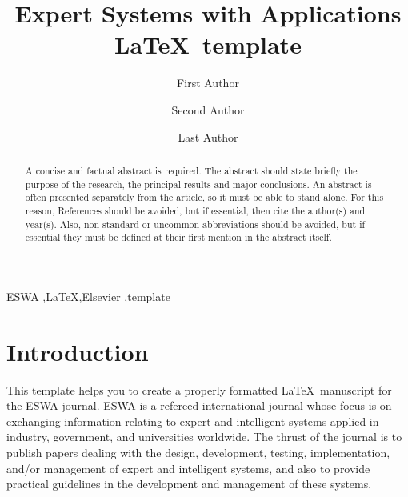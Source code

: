 \documentclass[review]{elsarticle}
\begin{document}
\begin{frontmatter}
\begin{titlepage}
\begin{center}
\begin{flushleft}
				\end{flushleft}        
			\end{center}
		\end{titlepage}
		
		\title{Expert Systems with Applications \LaTeX\ template}
		
		\author[label1,label2]{First Author}
		
		\author[label1]{Second Author}
		
		\author[label3]{Last Author }
		
		\address[label1]{Full address of first author, including the country name}
		\address[label2]{Full address of second author, including the country name}
		\address[label3]{Full address of last author, including the country name}
		
		\begin{abstract}
			A concise and factual abstract is required. The abstract should state briefly the purpose of the research, the principal results and major conclusions. An abstract is often presented separately from the article, so it must be able to stand alone. For this reason, References should be avoided, but if essential, then cite the author(s) and year(s). Also, non-standard or uncommon abbreviations should be avoided, but if essential they must be defined at their first mention in the abstract itself.
		\end{abstract}
		
		\begin{keyword}
			ESWA \sep \LaTeX \sep Elsevier \sep template
		\end{keyword}
		
	\end{frontmatter}
	
	\section{Introduction}
	\label{introduction}
	
	This template helps you to create a properly formatted \LaTeX\ manuscript for the ESWA journal. ESWA is a refereed international journal whose focus is on exchanging information relating to expert and intelligent systems applied in industry, government, and universities worldwide. The thrust of the journal is to publish papers dealing with the design, development, testing, implementation, and/or management of expert and intelligent systems, and also to provide practical guidelines in the development and management of these systems. 
	
\end{document}
